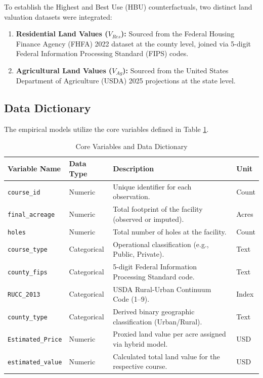 \documentclass[10pt, letterpaper]{article}
\begin{document}
To establish the Highest and Best Use (HBU) counterfactuals, two distinct land valuation datasets were integrated:
\begin{enumerate}
    \item \textbf{Residential Land Values ($V_{Res}$):} Sourced from the Federal Housing Finance Agency (FHFA) 2022 dataset at the county level, joined via 5-digit Federal Information Processing Standard (FIPS) codes.
    \item \textbf{Agricultural Land Values ($V_{Ag}$):} Sourced from the United States Department of Agriculture (USDA) 2025 projections at the state level.
\end{enumerate}

\subsection{Data Dictionary}
The empirical models utilize the core variables defined in Table \ref{tab:data_dict}.

\begin{table}[h!]
\centering
\caption{Core Variables and Data Dictionary}
\label{tab:data_dict}
\renewcommand{\arraystretch}{1.2}
\begin{tabular}{p{3.5cm} p{2cm} p{7cm} p{2.5cm}}
\hline
\textbf{Variable Name} & \textbf{Data Type} & \textbf{Description} & \textbf{Unit} \\
\hline
\texttt{course\_id} & Numeric & Unique identifier for each observation. & Count \\
\texttt{final\_acreage} & Numeric & Total footprint of the facility (observed or imputed). & Acres \\
\texttt{holes} & Numeric & Total number of holes at the facility. & Count \\
\texttt{course\_type} & Categorical & Operational classification (e.g., Public, Private). & Text \\
\texttt{county\_fips} & Categorical & 5-digit Federal Information Processing Standard code. & Text \\
\texttt{RUCC\_2013} & Categorical & USDA Rural-Urban Continuum Code (1--9). & Index \\
\texttt{county\_type} & Categorical & Derived binary geographic classification (Urban/Rural). & Text \\
\texttt{Estimated\_Price} & Numeric & Proxied land value per acre assigned via hybrid model. & USD \\
\texttt{estimated\_value} & Numeric & Calculated total land value for the respective course. & USD \\
\hline
\end{tabular}
\end{table}
\end{document}
